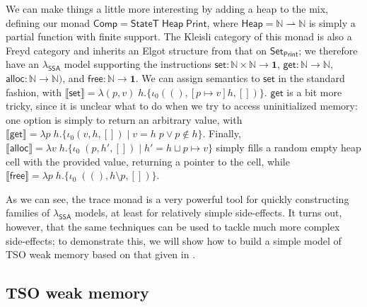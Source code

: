 \documentclass[acmsmall,screen,review]{acmart}
\newcommand{\mb}[1]{\ensuremath{\mathbf{#1}}}
\newcommand{\ms}[1]{\ensuremath{\mathsf{#1}}}
\newcommand{\nats}{\mathbb{N}}
\newcommand{\dnt}[1]{\llbracket{#1}\rrbracket}
\newcommand{\isotopessa}{\(\lambda_{\ms{SSA}}\)}
\begin{document}
We can make things a little more interesting by adding a heap to the mix, defining our monad
\(\ms{Comp} = \ms{StateT}\;\ms{Heap}\;\ms{Print}\), where \(\ms{Heap} = \nats \rightharpoonup
\nats\) is simply a partial function with finite support. The Kleisli category of this monad is also
a Freyd category and inherits an Elgot structure from that on \(\ms{Set}_{\ms{Print}}\); we
therefore have an \isotopessa{} model supporting the instructions \(\ms{set}: \nats \times \nats \to
\mb{1}\), \(\ms{get}: \nats \to \nats\), \(\ms{alloc}: \nats \to \nats)\), and \(\ms{free}: \nats
\to \mb{1}\). We can assign semantics to \(\ms{set}\) in the standard fashion, with \(\dnt{\ms{set}}
= \lambda (p, v)\;h. \{\iota_0((), [p \mapsto v]h, [])\}\). \(\ms{get}\) is a bit more tricky, since
it is unclear what to do when we try to access uninitialized memory: one option is simply to return
an arbitrary value, with \(\dnt{\ms{get}} = \lambda p\;h. \{\iota_0(v, h, []) \mid v = h\;p \lor p
\notin h\}\). Finally, \(\dnt{\ms{alloc}} = \lambda v\;h.\{\iota_0\;(p, h', []) \mid h' = h \sqcup p
\mapsto v\}\) simply fills a random empty heap cell with the provided value, returning a pointer to
the cell, while \(\dnt{\ms{free}} = \lambda p\;h. \{\iota_0\;((), h \setminus p, [])\}\).

As we can see, the trace monad is a very powerful tool for quickly constructing families of
\isotopessa{} models, at least for relatively simple side-effects. It turns out, however, that the
same techniques can be used to tackle much more complex side-effects; to demonstrate this, we will
show how to build a simple model of TSO weak memory based on that given in \citet{sparky}.

\subsection{TSO weak memory}

\label{ssec:tso}
\end{document}
